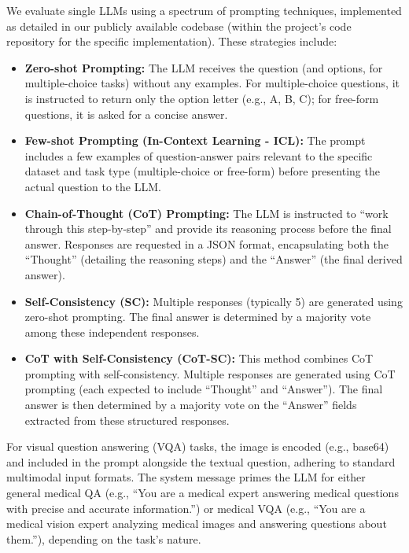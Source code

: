 \documentclass{article}
\begin{document}
We evaluate single LLMs using a spectrum of prompting techniques, implemented as detailed in our publicly available codebase (within the project's code repository for the specific implementation). These strategies include:
\begin{itemize}
    \item \textbf{Zero-shot Prompting:} The LLM receives the question (and options, for multiple-choice tasks) without any examples. For multiple-choice questions, it is instructed to return only the option letter (e.g., A, B, C); for free-form questions, it is asked for a concise answer.
    \item \textbf{Few-shot Prompting (In-Context Learning - ICL):} The prompt includes a few examples of question-answer pairs relevant to the specific dataset and task type (multiple-choice or free-form) before presenting the actual question to the LLM.
    \item \textbf{Chain-of-Thought (CoT) Prompting:} The LLM is instructed to ``work through this step-by-step'' and provide its reasoning process before the final answer. Responses are requested in a JSON format, encapsulating both the ``Thought'' (detailing the reasoning steps) and the ``Answer'' (the final derived answer).
    \item \textbf{Self-Consistency (SC):} Multiple responses (typically 5) are generated using zero-shot prompting. The final answer is determined by a majority vote among these independent responses.
    \item \textbf{CoT with Self-Consistency (CoT-SC):} This method combines CoT prompting with self-consistency. Multiple responses are generated using CoT prompting (each expected to include ``Thought'' and ``Answer''). The final answer is then determined by a majority vote on the ``Answer'' fields extracted from these structured responses.
\end{itemize}
For visual question answering (VQA) tasks, the image is encoded (e.g., base64) and included in the prompt alongside the textual question, adhering to standard multimodal input formats. The system message primes the LLM for either general medical QA (e.g., ``You are a medical expert answering medical questions with precise and accurate information.'') or medical VQA (e.g., ``You are a medical vision expert analyzing medical images and answering questions about them.''), depending on the task's nature.
\end{document}
